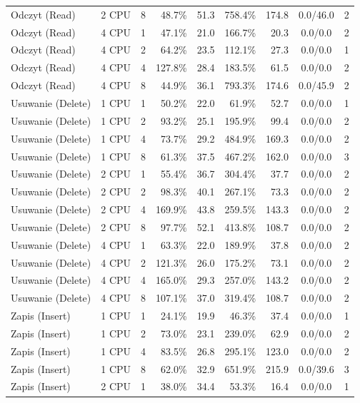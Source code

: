 \begin{table}[ht]
{\begin{tabular}{llcrrrrcc}
Odczyt (Read) & 2 CPU & 8 & 48.7\% & 51.3 & 758.4\% & 174.8 & 0.0/46.0 & 2 \\
Odczyt (Read) & 4 CPU & 1 & 47.1\% & 21.0 & 166.7\% & 20.3 & 0.0/0.0 & 2 \\
Odczyt (Read) & 4 CPU & 2 & 64.2\% & 23.5 & 112.1\% & 27.3 & 0.0/0.0 & 1 \\
Odczyt (Read) & 4 CPU & 4 & 127.8\% & 28.4 & 183.5\% & 61.5 & 0.0/0.0 & 2 \\
Odczyt (Read) & 4 CPU & 8 & 44.9\% & 36.1 & 793.3\% & 174.6 & 0.0/45.9 & 2 \\
Usuwanie (Delete) & 1 CPU & 1 & 50.2\% & 22.0 & 61.9\% & 52.7 & 0.0/0.0 & 1 \\
Usuwanie (Delete) & 1 CPU & 2 & 93.2\% & 25.1 & 195.9\% & 99.4 & 0.0/0.0 & 2 \\
Usuwanie (Delete) & 1 CPU & 4 & 73.7\% & 29.2 & 484.9\% & 169.3 & 0.0/0.0 & 2 \\
Usuwanie (Delete) & 1 CPU & 8 & 61.3\% & 37.5 & 467.2\% & 162.0 & 0.0/0.0 & 3 \\
Usuwanie (Delete) & 2 CPU & 1 & 55.4\% & 36.7 & 304.4\% & 37.7 & 0.0/0.0 & 2 \\
Usuwanie (Delete) & 2 CPU & 2 & 98.3\% & 40.1 & 267.1\% & 73.3 & 0.0/0.0 & 2 \\
Usuwanie (Delete) & 2 CPU & 4 & 169.9\% & 43.8 & 259.5\% & 143.3 & 0.0/0.0 & 2 \\
Usuwanie (Delete) & 2 CPU & 8 & 97.7\% & 52.1 & 413.8\% & 108.7 & 0.0/0.0 & 2 \\
Usuwanie (Delete) & 4 CPU & 1 & 63.3\% & 22.0 & 189.9\% & 37.8 & 0.0/0.0 & 2 \\
Usuwanie (Delete) & 4 CPU & 2 & 121.3\% & 26.0 & 175.2\% & 73.1 & 0.0/0.0 & 2 \\
Usuwanie (Delete) & 4 CPU & 4 & 165.0\% & 29.3 & 257.0\% & 143.2 & 0.0/0.0 & 2 \\
Usuwanie (Delete) & 4 CPU & 8 & 107.1\% & 37.0 & 319.4\% & 108.7 & 0.0/0.0 & 2 \\
Zapis (Insert) & 1 CPU & 1 & 24.1\% & 19.9 & 46.3\% & 37.4 & 0.0/0.0 & 1 \\
Zapis (Insert) & 1 CPU & 2 & 73.0\% & 23.1 & 239.0\% & 62.9 & 0.0/0.0 & 2 \\
Zapis (Insert) & 1 CPU & 4 & 83.5\% & 26.8 & 295.1\% & 123.0 & 0.0/0.0 & 2 \\
Zapis (Insert) & 1 CPU & 8 & 62.0\% & 32.9 & 651.9\% & 215.9 & 0.0/39.6 & 3 \\
Zapis (Insert) & 2 CPU & 1 & 38.0\% & 34.4 & 53.3\% & 16.4 & 0.0/0.0 & 1 \\

\end{tabular}}
\end{table}

